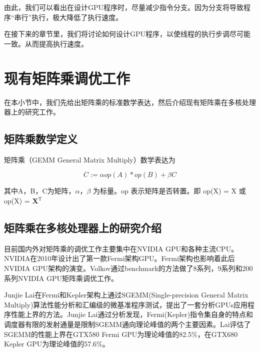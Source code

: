 由此，我们可以看出在设计GPU程序时，尽量减少指令分支。因为分支将导致程序“串行”执行，极大降低了执行速度。

在接下来的章节里，我们将讨论如何设计GPU程序，以使线程的执行步调尽可能一致。从而提高执行速度。

\section{现有矩阵乘调优工作}
在本小节中，我们先给出矩阵乘的标准数学表达，然后介绍现有矩阵乘在多核处理器上的研究工作。

\subsection{矩阵乘数学定义}
矩阵乘（GEMM General Matrix Multiply）数学表达为

\begin{equation}
	C:= \alpha op(A)*op(B) + \beta C
\end{equation}

其中A，B，C为矩阵，$\alpha$，$\beta$ 为标量。op 表示矩阵是否转置。即 op(X) = X 或 op(X) = $\mathbf{X}^\mathrm{T}$

\subsection{矩阵乘在多核处理器上的研究介绍}
目前国内外对矩阵乘的调优工作主要集中在NVIDIA GPU和各种主流CPU。NVIDIA在2010年设计出了第一款Fermi架构GPU。Fermi架构也影响着此后NVIDIA GPU架构的演变。Volkov通过benchmark的方法做了8系列，9系列和200系列NVIDIA GPU矩阵乘调优工作。

Junjie Lai在Fermi和Kepler架构上通过SGEMM(Single-precision General Matrix Multiply)算法性能分析和汇编级的微基准程序测试，提出了一套分析GPUs应用程序性能上界的方法。Junjie Lai通过分析发现，Fermi(Kepler)指令集自身的特点和调度器有限的发射通量是限制SGEMM通向理论峰值的两个主要因素。Lai评估了SGEMM的性能上界在GTX580 Fermi GPU为理论峰值的82.5\%，在GTX680 Kepler GPU为理论峰值的57.6\%。

